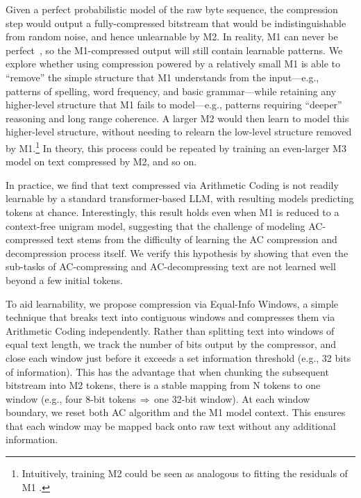 Given a perfect probabilistic model of the raw byte sequence, the compression step would output a fully-compressed bitstream that would be indistinguishable from random noise, and hence unlearnable by M2\@.
In reality, M1 can never be perfect~\citep{NoPerfectModel}, so the M1-compressed output will still contain learnable patterns. We explore whether using compression powered by a relatively small M1 is able to ``remove'' the simple structure that M1 understands from the input---e.g., patterns of spelling, word frequency, and basic grammar---while retaining any higher-level structure that M1 fails to model---e.g., patterns requiring ``deeper'' reasoning and long range coherence. A larger M2 would then learn to model this higher-level structure, without needing to relearn the low-level structure removed by M1\@.\footnote{Intuitively, training M2 could be seen as analogous to fitting the residuals of M1 \cite{friedmanGreedyFunctionApproximation2001}.} In theory, this process could be repeated by training an even-larger M3 model on text compressed by M2, and so on.

In practice, we find that text compressed via Arithmetic Coding is not readily learnable by a standard transformer-based LLM, with resulting models predicting tokens at chance. Interestingly, this result holds even when M1 is reduced to a context-free unigram model, suggesting that the challenge of modeling AC-compressed text stems from the difficulty of learning the AC compression and decompression process itself. We verify this hypothesis by showing that even the sub-tasks of AC-compressing and AC-decompressing text are not learned well beyond a few initial tokens.

To aid learnability, we propose compression via Equal-Info Windows, a simple technique that breaks text into contiguous windows and compresses them via Arithmetic Coding independently. Rather than splitting text into windows of equal text length, we track the number of bits output by the compressor, and close each window just before it exceeds a set information threshold (e.g., 32 bits of information). This has the advantage that when chunking the subsequent bitstream into M2 tokens, there is a stable mapping from N tokens to one window (e.g., four 8-bit tokens\,$\Rightarrow$\,one 32-bit window). At each window boundary, we reset both AC algorithm and the M1 model context. This ensures that each window may be mapped back onto raw text without any additional information.

